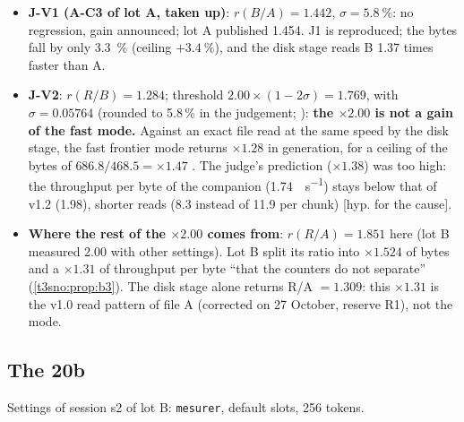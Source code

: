 \begin{itemize}
\item \textbf{J-V1 (A-C3 of lot A, taken up)}: $r(B/A) = \num{1.442}$, $\sigma = \SI{5.8}{\percent}$: no regression, gain announced; lot A published \num{1.454}. J1 is reproduced; the bytes fall by only \SI{3.3}{\percent} (ceiling $+\SI{3.4}{\percent}$), and the disk stage reads B \num{1.37} times faster than A.
\item \textbf{J-V2}: $r(R/B) = \num{1.284}$; threshold $2.00 \times (1 - 2\sigma) = \num{1.769}$, with $\sigma = \num{0.05764}$ (rounded to 5.8\,\% in the judgement; ): \textbf{the $\times 2.00$ is not a gain of the fast mode.} Against an exact file read at the same speed by the disk stage, the fast frontier mode returns $\times 1.28$ in generation, for a ceiling of the bytes of $686.8/468.5 = \times 1.47$ \calc. The judge's prediction ($\times 1.38$) was too high: the throughput per byte of the companion (\SI{1.74}{\Go\per\second}) stays below that of v1.2 (\num{1.98}), shorter reads (\SI{8.3}{\Mo} instead of \num{11.9} per chunk) [hyp. for the cause].
\item \textbf{Where the rest of the $\times 2.00$ comes from}: $r(R/A) = \num{1.851}$ here (lot B measured 2.00 with other settings). Lot B split its ratio into $\times 1.524$ of bytes and a $\times 1.31$ of throughput per byte ``that the counters do not separate'' (\cref{t3sno:prop:b3}). The disk stage alone returns R/A $= \num{1.309}$: this $\times 1.31$ is  the v1.0 read pattern of file A (corrected on 27 October, reserve R1), not the mode.
\end{itemize}

\subsection{The 20b}\label{t3jug:sec:v20}

Settings of session s2 of lot B: \texttt{mesurer}, default slots, 256 tokens.

